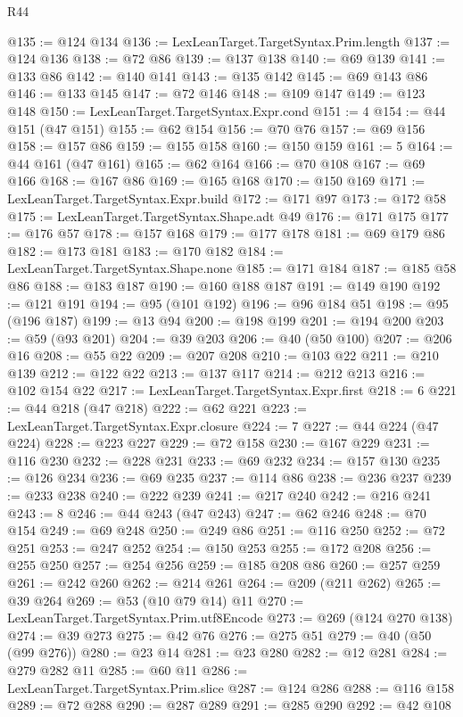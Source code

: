 \begin{lexlean}{R44}
\begin{coremodule}
@135 := @124 @134
@136 := LexLeanTarget.TargetSyntax.Prim.length
@137 := @124 @136
@138 := @72 @86
@139 := @137 @138
@140 := @69 @139
@141 := @133 @86
@142 := @140 @141
@143 := @135 @142
@145 := @69 @143 @86
@146 := @133 @145
@147 := @72 @146
@148 := @109 @147
@149 := @123 @148
@150 := LexLeanTarget.TargetSyntax.Expr.cond
@151 := 4
@154 := @44 @151 (@47 @151)
@155 := @62 @154
@156 := @70 @76
@157 := @69 @156
@158 := @157 @86
@159 := @155 @158
@160 := @150 @159
@161 := 5
@164 := @44 @161 (@47 @161)
@165 := @62 @164
@166 := @70 @108
@167 := @69 @166
@168 := @167 @86
@169 := @165 @168
@170 := @150 @169
@171 := LexLeanTarget.TargetSyntax.Expr.build
@172 := @171 @97
@173 := @172 @58
@175 := LexLeanTarget.TargetSyntax.Shape.adt @49
@176 := @171 @175
@177 := @176 @57
@178 := @157 @168
@179 := @177 @178
@181 := @69 @179 @86
@182 := @173 @181
@183 := @170 @182
@184 := LexLeanTarget.TargetSyntax.Shape.none
@185 := @171 @184
@187 := @185 @58 @86
@188 := @183 @187
@190 := @160 @188 @187
@191 := @149 @190
@192 := @121 @191
@194 := @95 (@101 @192)
@196 := @96 @184 @51
@198 := @95 (@196 @187)
@199 := @13 @94
@200 := @198 @199
@201 := @194 @200
@203 := @59 (@93 @201)
@204 := @39 @203
@206 := @40 (@50 @100)
@207 := @206 @16
@208 := @55 @22
@209 := @207 @208
@210 := @103 @22
@211 := @210 @139
@212 := @122 @22
@213 := @137 @117
@214 := @212 @213
@216 := @102 @154 @22
@217 := LexLeanTarget.TargetSyntax.Expr.first
@218 := 6
@221 := @44 @218 (@47 @218)
@222 := @62 @221
@223 := LexLeanTarget.TargetSyntax.Expr.closure
@224 := 7
@227 := @44 @224 (@47 @224)
@228 := @223 @227
@229 := @72 @158
@230 := @167 @229
@231 := @116 @230
@232 := @228 @231
@233 := @69 @232
@234 := @157 @130
@235 := @126 @234
@236 := @69 @235
@237 := @114 @86
@238 := @236 @237
@239 := @233 @238
@240 := @222 @239
@241 := @217 @240
@242 := @216 @241
@243 := 8
@246 := @44 @243 (@47 @243)
@247 := @62 @246
@248 := @70 @154
@249 := @69 @248
@250 := @249 @86
@251 := @116 @250
@252 := @72 @251
@253 := @247 @252
@254 := @150 @253
@255 := @172 @208
@256 := @255 @250
@257 := @254 @256
@259 := @185 @208 @86
@260 := @257 @259
@261 := @242 @260
@262 := @214 @261
@264 := @209 (@211 @262)
@265 := @39 @264
@269 := @53 (@10 @79 @14) @11
@270 := LexLeanTarget.TargetSyntax.Prim.utf8Encode
@273 := @269 (@124 @270 @138)
@274 := @39 @273
@275 := @42 @76
@276 := @275 @51
@279 := @40 (@50 (@99 @276))
@280 := @23 @14
@281 := @23 @280
@282 := @12 @281
@284 := @279 @282 @11
@285 := @60 @11
@286 := LexLeanTarget.TargetSyntax.Prim.slice
@287 := @124 @286
@288 := @116 @158
@289 := @72 @288
@290 := @287 @289
@291 := @285 @290
@292 := @42 @108

\end{coremodule}
\end{lexlean}
